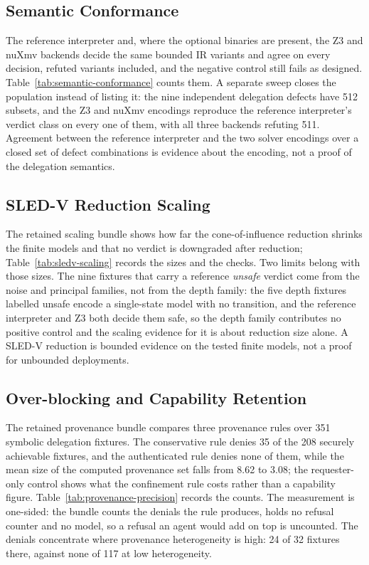 \documentclass[11pt]{article}
\begin{document}
\subsection{Semantic Conformance}

The reference interpreter and, where the optional binaries are present, the
Z3 and nuXmv backends decide the same bounded IR variants and agree on every
decision, refuted variants included, and the negative control still fails as
designed. Table~\ref{tab:semantic-conformance} counts them. A separate sweep
closes the population instead of listing it: the nine independent delegation
defects have 512 subsets, and the Z3 and nuXmv encodings reproduce the
reference interpreter's verdict class on every one of them, with all three
backends refuting 511. Agreement between the reference interpreter and the
two solver encodings over a closed set of defect combinations is evidence
about the encoding, not a proof of the delegation semantics.



\subsection{SLED-V Reduction Scaling}

The retained scaling bundle shows how far the cone-of-influence reduction
shrinks the finite models and that no verdict is downgraded after reduction;
Table~\ref{tab:sledv-scaling} records the sizes and the checks. Two limits
belong with those sizes. The nine fixtures that carry a reference
\emph{unsafe} verdict come from the noise and principal families, not from
the depth family: the five depth fixtures labelled unsafe encode a
single-state model with no transition, and the reference interpreter and Z3
both decide them safe, so the depth family contributes no positive control
and the scaling evidence for it is about reduction size alone. A SLED-V
reduction is bounded evidence on the tested finite models, not a proof for
unbounded deployments.



\subsection{Over-blocking and Capability Retention}

The retained provenance bundle compares three provenance rules over 351
symbolic delegation fixtures. The conservative rule denies 35 of the 208
securely achievable fixtures, and the authenticated rule denies none of them,
while the mean size of the computed provenance set falls from 8.62 to 3.08;
the requester-only control shows what the confinement rule costs rather than
a capability figure. Table~\ref{tab:provenance-precision} records the counts.
The measurement is one-sided: the bundle counts the denials the rule
produces, holds no refusal counter and no model, so a refusal an agent would
add on top is uncounted. The denials concentrate where provenance
heterogeneity is high: 24 of 32 fixtures there, against none of 117 at low
heterogeneity.
\end{document}
